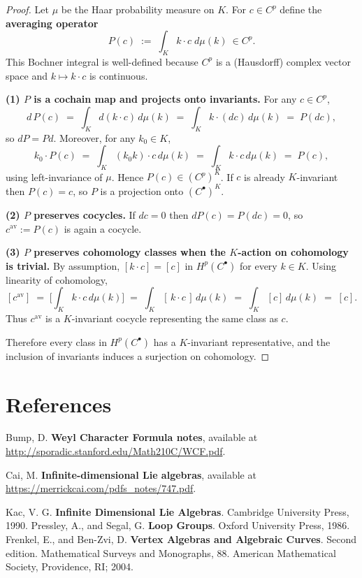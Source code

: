\documentclass[12pt]{article}
\begin{document}
\begin{proof}
    Let $\mu$ be the Haar probability measure on $K$. For $c\in C^p$ define the
    \textbf{averaging operator}
    \[
        P(c)\;:=\;\int_{K} k\cdot c\; d\mu(k)\ \in C^p.
    \]
    This Bochner integral is well-defined because $C^p$ is a (Hausdorff) complex
    vector space and $k\mapsto k\cdot c$ is continuous.

    \smallskip

    \textbf{(1) $P$ is a cochain map and projects onto invariants.}
    For any $c\in C^p$,
    \[
        d\,P(c)\;=\;\int_K d(k\cdot c)\,d\mu(k)\;=\;\int_K k\cdot (dc)\,d\mu(k)\;=\;P(dc),
    \]
    so $dP=Pd$. Moreover, for any $k_0\in K$,
    \[
        k_0\cdot P(c)\;=\;\int_K (k_0k)\cdot c\,d\mu(k)\;=\;\int_K k\cdot c\,d\mu(k)\;=\;P(c),
    \]
    using left-invariance of $\mu$. Hence $P(c)\in (C^p)^K$. If $c$ is already
    $K$-invariant then $P(c)=c$, so $P$ is a projection onto $(C^\bullet)^K$.

    \smallskip

    \textbf{(2) $P$ preserves cocycles.}
    If $dc=0$ then $dP(c)=P(dc)=0$, so $c^{\mathrm{av}}:=P(c)$ is again a cocycle.

    \smallskip

    \textbf{(3) $P$ preserves cohomology classes when the $K$-action on cohomology is trivial.}
    By assumption, $[k\cdot c]=[c]$ in $H^p(C^\bullet)$ for every $k\in K$. Using linearity
    of cohomology,
    \[
        [c^{\mathrm{av}}]\;=\;\Big[\int_K k\cdot c\,d\mu(k)\Big]
        \;=\;\int_K [\,k\cdot c\,]\,d\mu(k)
        \;=\;\int_K [c]\,d\mu(k)
        \;=\;[c].
    \]
    Thus $c^{\mathrm{av}}$ is a $K$-invariant cocycle representing the same class as $c$.

    Therefore every class in $H^p(C^\bullet)$ has a $K$-invariant representative,
    and the inclusion of invariants induces a surjection on cohomology.
\end{proof}


\section{References}
\begin{enumerate}
     Bump, D. \textbf{Weyl Character Formula notes}, available at \url{http://sporadic.stanford.edu/Math210C/WCF.pdf}.

     Cai, M. \textbf{Infinite-dimensional Lie algebras}, available at \url{https://merrickcai.com/pdfs_notes/747.pdf}.

     Kac, V. G. \textbf{Infinite Dimensional Lie Algebras}. Cambridge University Press, 1990.
     Pressley, A., and Segal, G. \textbf{Loop Groups}. Oxford University Press, 1986.
     Frenkel, E., and Ben-Zvi, D. \textbf{Vertex Algebras and Algebraic Curves}. Second edition. Mathematical Surveys and Monographs, 88. American Mathematical Society, Providence, RI; 2004.
\end{enumerate}
\end{document}
